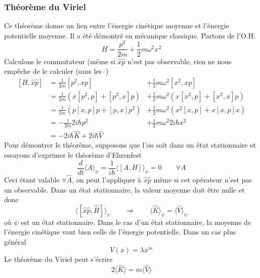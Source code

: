		\subsubsection{Théorème du Viriel}
		Ce théorème donne un lien entre l'énergie cinétique moyenne et l'énergie potentielle moyenne. Il 
		a été démontré en mécanique classique. Partons de l'O.H.
		\begin{equation}
		H = \frac{p^2}{2m}+\frac{1}{2}m\omega^2x^2
		\end{equation}
		Calculons le commutateur (même si $\hat{x}\hat{p}$ n'est pas observable, rien ne nous empêche de 
		le calculer (sans les $\hat{\ }$)
		\begin{equation}
		\begin{array}{lll}
		[H,\hat{x}\hat{p}] &= \frac{1}{2m}[p^2,xp] &+ \frac{1}{2}m\omega^2[x^2,xp]\\
		&=\frac{1}{2m}(x[p^2,p]+[p^2,x]p) &+ \frac{1}{2}m\omega^2(x[x^2,p]+[x^2,x]p)\\
		&=\frac{1}{2m}(p[x,p]p + [p,x]p^2) &+ \frac{1}{2}m\omega^2(x^2[x,p]+x[x,p]x)\\
		&=-\frac{1}{2m}2i\hbar p^2 &+ \frac{1}{2}m\omega^2 2i\hbar x^2\\		
		&= -2i\hbar\hat{K}+2i\hbar\hat{V}
		\end{array}
		\end{equation}
		Pour démontrer le théorème, supposons que l'on soit dans un état stationnaire et essayons d'exprimer 
		le théorème d'Ehrenfest
		\begin{equation}
		\dfrac{d}{dt}\langle A\rangle_\psi = \frac{1}{i\hbar}\langle[A,H]\rangle_\psi = 0\qquad \forall A
		\end{equation}
		Ceci étant valable $\forall \hat{A}$, on peut l'appliquer à $\hat{x}\hat{p}$ même si cet opérateur 
		n'est pas un observable. Dans un état stationnaire, la valeur moyenne doit être nulle et donc
		\begin{equation}
		\langle[\hat{x}\hat{p},\hat{H}]\rangle_\psi\qquad\Longrightarrow\qquad \langle \hat{K}\rangle_\psi =
		\langle \hat{V}\rangle_\psi 
		\end{equation}
		où $\psi$ est un état stationnaire. Dans le cas d'un état stationnaire, la moyenne de l'énergie 
		cinétique vaut bien celle de l'énergie potentielle. Dans un cas plus	général	
		\begin{equation}
		V(x) = \lambda x^m
		\end{equation}
		Le théorème du Viriel peut s'écrire
		\begin{equation}
		2\langle\hat{K}\rangle = m\langle\hat{V}\rangle
		\end{equation}
	




